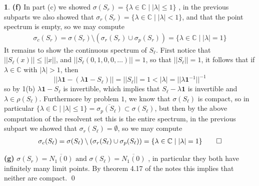 \documentclass[11pt]{article}
\theoremstyle{definition}
\newtheorem{pb}{}
\newcommand{\set}[1]{\{#1\}}
\newcommand{\abs}[1]{\left\vert#1\right\vert}
\newcommand{\norm}[1]{\lvert\lvert#1\rvert\rvert}
\newcommand{\tand}{\text{ and }}
\begin{document}
\begin{pb}
        \textbf{(f)} In part (c) we showed \(\sigma(S_r) = \set{\lambda \in \mathbb{C} \mid \abs{\lambda} \leq 1}\) , in the previous subparts we also showed that \(\sigma_r(S_r) = \set{\lambda \in \mathbb{C} \mid \abs{\lambda} < 1}\), and that the point spectrum is empty, so we may compute
        \begin{align*}
            \sigma_c(S_r) = \sigma(S_r) \setminus (\sigma_r(S_r)\cup \sigma_p(S_r)) = \set{\lambda \in \mathbb{C} \mid \abs{\lambda} = 1}
        \end{align*}
        It remains to show the continuous spectrum of \(S_\ell\). First notice that \(\norm{S_\ell(x)} \leq \norm{x}\), and \(\norm{S_\ell(0,1,0,0,\hdots)} = 1\), so that \(\norm{S_\ell} = 1\), it follows that if \(\lambda \in \mathbb{C}\) with \(\abs{\lambda} > 1\), then \[\norm{\lambda\mathbf{1} - (\lambda\mathbf{1} - S_\ell)} = \norm{S_\ell} = 1 < \abs{\lambda} = \norm{\lambda\mathbf{1}^{-1}}^{-1}\]
        so by 1(b) \(\lambda\mathbf{1} - S_\ell\) is invertible, which implies that \(S_\ell - \lambda\mathbf{1}\) is invertible and \(\lambda \in \rho(S_\ell)\). Furthermore by problem \(1\), we know that \(\sigma(S_\ell)\) is compact, so in particular \(\set{\lambda \in \mathbb{C} \mid \abs{\lambda} \leq 1} = \overline{\sigma_p(S_\ell)} \subset \sigma(S_\ell)\), but then by the above computation of the resolvent set this is the entire spectrum, in the previous subpart we showed that \(\sigma_r(S_\ell) = \emptyset\), so we may compute
        \begin{align*}
            \sigma_c(S_\ell) = \sigma(S_\ell) \setminus (\sigma_r(S_\ell) \cup \sigma_p(S_\ell)) = \set{\lambda \in \mathbb{C} \mid \abs{\lambda} = 1} \qed
        \end{align*}

        \textbf{(g)} \(\sigma(S_r)= \overline{N_1(0)} \tand \sigma(S_\ell) = \overline{N_1(0)}\) , in particular they both have infinitely many limit points. By theorem 4.17 of the notes this implies that neither are compact. \qed
    \end{pb}
\end{document}
